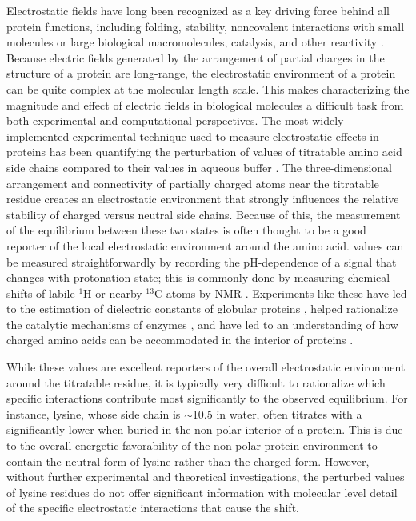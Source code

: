 Electrostatic fields have long been recognized as a key driving force behind all protein functions, including folding, stability, noncovalent interactions with small molecules or large biological macromolecules, catalysis, and other reactivity \cite{Hayes1976, Warshel1978, Honig1995, Gunner1996, Warshel1998}.
Because electric fields generated by the arrangement of partial charges in the structure of a protein are long-range, the electrostatic environment of a protein can be quite complex at the molecular length scale. 
This makes characterizing the magnitude and effect of electric fields in biological molecules a difficult task from both experimental and computational perspectives. 
The most widely implemented experimental technique used to measure electrostatic effects in proteins has been quantifying the perturbation of \pKa{} values of titratable amino acid side chains compared to their values in aqueous buffer \cite{Forsyth2002, Langsetmo1991, Isom2010, Bradbury1966, Markley1975}.
The three-dimensional arrangement and connectivity of partially charged atoms near the titratable residue creates an electrostatic environment that strongly influences the relative stability of charged versus neutral side chains. 
Because of this, the measurement of the equilibrium between these two states is often thought to be a good reporter of the local electrostatic environment around the amino acid. 
\pKa{} values can be measured straightforwardly by recording the pH-dependence of a signal that changes with protonation state; this is commonly done by measuring chemical shifts of labile $^1$H or nearby $^{13}$C atoms by NMR \cite{Markley1975}. 
Experiments like these have led to the estimation of dielectric constants of globular proteins \cite{Dwyer2000, Chimenti2011}, helped rationalize the catalytic mechanisms of enzymes \cite{Inoue1992, Davoodi1995, McIntosh1996}, and have led to an understanding of how charged amino acids can be accommodated in the interior of proteins \cite{Isom2010, Chimenti2011, Isom2008}.

While these \pKa{} values are excellent reporters of the overall electrostatic environment around the titratable residue, it is typically very difficult to rationalize which specific interactions contribute most significantly to the observed equilibrium. 
For instance, lysine, whose side chain \pKa{} is $\sim$10.5 in water, often titrates with a significantly lower \pKa{} when buried in the non-polar interior of a protein. 
This is due to the overall energetic favorability of the non-polar protein environment to contain the neutral form of lysine rather than the charged form. 
However, without further experimental and theoretical investigations, the perturbed \pKa{} values of lysine residues do not offer significant information with molecular level detail of the specific electrostatic interactions that cause the \pKa{} shift.  

